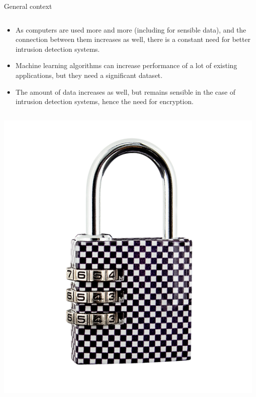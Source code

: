 \documentclass[11pt,t]{beamer}
\begin{document}
\begin{frame}{General context}
\begin{column}{.7\textwidth}
\begin{itemize}
    \item As computers are used more and more (including for sensible data), and the connection between them increases as well, there is a constant need for better intrusion detection systems.
    \item Machine learning algorithms can increase performance of a lot of existing applications, but they need a significant dataset.
    \item The amount of data increases as well, but remains sensible in the case of intrusion detection systems, hence the need for encryption.
\end{itemize}
	\end{column}
\begin{column}{.3\textwidth}
		\centering
		\includegraphics[width=1\textwidth]{cadenas}
	\end{column}
\end{frame}
\end{document}
